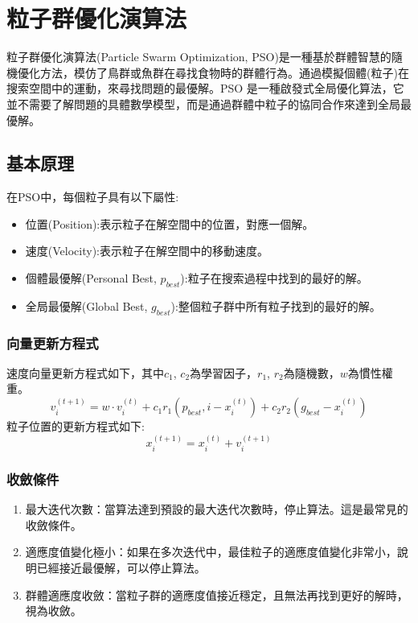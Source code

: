 \section{粒子群優化演算法}
粒子群優化演算法(Particle Swarm Optimization, PSO)是一種基於群體智慧的隨機優化方法，模仿了鳥群或魚群在尋找食物時的群體行為。通過模擬個體(粒子)在搜索空間中的運動，來尋找問題的最優解。PSO 是一種啟發式全局優化算法，它並不需要了解問題的具體數學模型，而是通過群體中粒子的協同合作來達到全局最優解。
\subsection{基本原理}
在PSO中，每個粒子具有以下屬性:
\begin{itemize}
    \item 位置(Position):表示粒子在解空間中的位置，對應一個解。
    \item 速度(Velocity):表示粒子在解空間中的移動速度。
    \item 個體最優解(Personal Best, $p_{best}$​):粒子在搜索過程中找到的最好的解。
    \item 全局最優解(Global Best, $g_{best}$):整個粒子群中所有粒子找到的最好的解。
\end{itemize}

\subsubsection{向量更新方程式}
速度向量更新方程式如下，其中$c_1$, $c_2$為學習因子，$r_1$, $r_2$為隨機數，$w$為慣性權重。
\begin{equation} \label{eq:PSO_velocity}
    v_{i}^{(t+1)} = w \cdot v_{i}^{(t)} + c_{1}r_{1}(p_{best}, i - x_{i}^{(t)}) + c_{2}r_{2}(g_{best} - x_{i}^{(t)})
\end{equation}
粒子位置的更新方程式如下:
\begin{equation} \label{eq:PSO_position}
    x_{i}^{(t+1)} = x_{i}^{(t)} + v_{i}^{(t+1)}
\end{equation}

\subsubsection{收斂條件}
\begin{enumerate}
    \item 最大迭代次數：當算法達到預設的最大迭代次數時，停止算法。這是最常見的收斂條件。
    \item 適應度值變化極小：如果在多次迭代中，最佳粒子的適應度值變化非常小，說明已經接近最優解，可以停止算法。
    \item 群體適應度收斂：當粒子群的適應度值接近穩定，且無法再找到更好的解時，視為收斂。
\end{enumerate}


